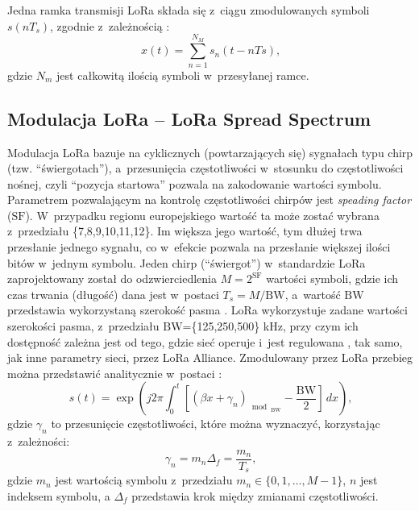 Jedna ramka transmisji LoRa składa się z~ciągu zmodulowanych symboli $s(nT_s)$, zgodnie z~zależnością
\cite{lora-modulation-fscm,lora-emulator}:
\begin{equation}
    x(t) = \sum_{n=1}^{N_M} s_n(t-nTs)\text{,}
\end{equation}
gdzie $N_m$ jest całkowitą ilością symboli w~przesyłanej ramce.

\subsection{\label{sect:lora-modulation}Modulacja LoRa -- LoRa Spread Spectrum} Modulacja LoRa bazuje na cyklicznych
(powtarzających się) sygnałach typu chirp (tzw. \enquote{świergotach}), a~przesunięcia częstotliwości w~stosunku do
częstotliwości nośnej, czyli \enquote{pozycja startowa} pozwala na zakodowanie wartości symbolu. Parametrem pozwalającym
na kontrolę częstotliwości chirpów jest \textsl{speading factor} ($\mathrm{SF}$). W~przypadku regionu europejskiego
wartość ta może zostać wybrana z~przedziału \{7,8,9,10,11,12\}. Im większa jego wartość, tym dłużej trwa przesłanie
jednego sygnału, co w~efekcie pozwala na przesłanie większej ilości bitów w~jednym symbolu. Jeden chirp
(\enquote{świergot}) w~standardzie LoRa zaprojektowany został do odzwierciedlenia $M=2^{\mathrm{SF}}$ wartości symboli,
gdzie ich czas trwania (długość) dana jest w~postaci $T_s=M/\mathrm{BW}$, a~wartość $\mathrm{BW}$ przedstawia
wykorzystaną szerokość pasma \cite{lora-modulation-fscm}. LoRa wykorzystuje zadane wartości szerokości pasma,
z~przedziału $\mathrm{BW}$=\{125,250,500\} kHz, przy czym ich dostępność zależna jest od tego, gdzie sieć operuje i~jest
regulowana \cite{lora-regional-parameters}, tak samo, jak inne parametry sieci, przez LoRa Alliance. Zmodulowany przez
LoRa przebieg można przedstawić analitycznie w~postaci \cite{lora-emulator}:
\begin{equation}\label{eqn:lora-waveform}
    s(t) = \exp{\left({j}2\pi\int_{0}^{t}\left[(\beta x+\gamma_n)_{\bmod{_{\mathrm{BW}}}}-\frac{\mathrm{BW}}{2}\right]\,dx\right)}\text{,}
\end{equation}
gdzie $\gamma_n$ to przesunięcie częstotliwości, które można wyznaczyć, korzystając z~zależności:
\begin{equation}
    \gamma_n = m_n\Delta_f = \frac{m_n}{T_s}\text{,}
\end{equation}
gdzie $m_n$ jest wartością symbolu z~przedziału $m_n\in\{0,1,\ldots,M-1\}$, $n$ jest indeksem symbolu, a $\Delta_f$
przedstawia krok między zmianami częstotliwości.

